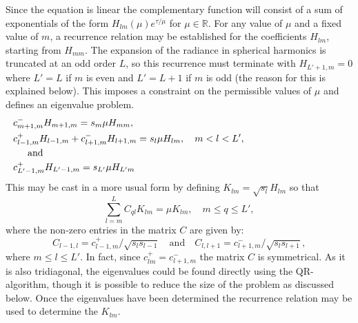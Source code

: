 Since the equation is linear the complementary function will consist of
a sum of exponentials of the form $H_{lm}(\mu)e^{\tau/\mu}$ 
for $\mu \in \mathbb{R}$. 
For any value of $\mu$ and a fixed value of $m$, a recurrence relation
may be established for the coefficients $H_{lm}$, starting from $H_{mm}$.
The expansion of the radiance in spherical harmonics is truncated at an
odd order $L$, so this recurrence must terminate with $H_{L'+1,m}=0$ where
$L'=L$ if $m$ is even and $L'=L+1$ if $m$ is odd (the reason for this 
is explained below). This
imposes a constraint on the permissible values of $\mu$ and defines an
eigenvalue problem.
\begin{align}
&c_{m+1,m}^- H_{m+1,m} = s_m \mu H_{mm},  \\
&c_{l-1,m}^+ H_{l-1,m}+ c_{l+1,m}^- H_{l+1,m} 
= s_l \mu H_{lm}, \quad m < l < L', \\
\noalign{and}
& c_{L'-1,m}^+ H_{L'-1, m} =  s_{L'} \mu H_{L'm}
\end{align}
This may be cast in a more usual form by defining $K_{lm}=\sqrt{s_l} H_{lm}$
so that
\begin{equation}
\sum_{l=m}^L C_{ql} K_{lm} =\mu K_{lm}, \quad m \leqslant q \leqslant L',
\end{equation}
where the non-zero entries in the matrix $C$ are given by:
\begin{equation}
C_{l-1,l}=c_{l-1,m}^+/\sqrt{s_l s_{l-1}} \quad \text{and}\quad
C_{l,l+1}=c_{l+1,m}^-/\sqrt{s_l s_{l+1}},
\end{equation}
where $m \leqslant l \leqslant L'$. In fact, since $c_{lm}^+=c_{l+1,m}^-$ the matrix $C$
is symmetrical. As it is also tridiagonal, the eigenvalues could be found
directly using the QR-algorithm, though it is possible to reduce the size 
of the problem as discussed below. Once the eigenvalues have been determined
the recurrence relation may be used to determine the $K_{lm}$. 

